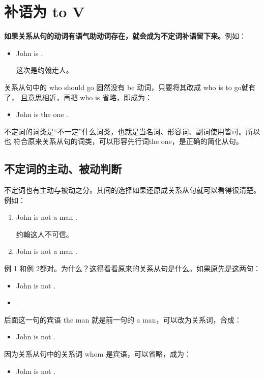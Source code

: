 \section{补语为 to V}

\textbf{如果关系从句的动词有语气助动词存在，就会成为不定词补语留下来。}例如：
\begin{itemize}
\item John is  .

  这次是约翰走人。
\end{itemize}
关系从句中的 who should go 固然没有 be 动词，只要将其改成 who is to go就有了，
且意思相近，再把 who is 省略，即成为：
\begin{itemize}
\item   John is the one .
\end{itemize}

不定词的词类是“不一定”什么词类，也就是当名词、形容词、副词使用皆可。所以也
符合原来关系从句的词类，可以形容先行词the one，是正确的简化从句。

\subsection{不定词的主动、被动判断}

不定词也有主动与被动之分。其间的选择如果还原成关系从句就可以看得很清楚。例如：
\begin{enumerate}
\item John is not a man .

  约翰这人不可信。
\item John is not a man  .
\end{enumerate}
例 1 和例 2都对。为什么？这得看看原来的关系从句是什么。如果原先是这两句：
\begin{itemize}
\item John is not .
\item {}  .
\end{itemize}
后面这一句的宾语 the man 就是前一句的 a man，可以改为关系词，合成：
\begin{itemize}
\item John is not  .
\end{itemize}

因为关系从句中的关系词 whom 是宾语，可以省略，成为：
\begin{itemize}
\item John is not  .
\end{itemize}

